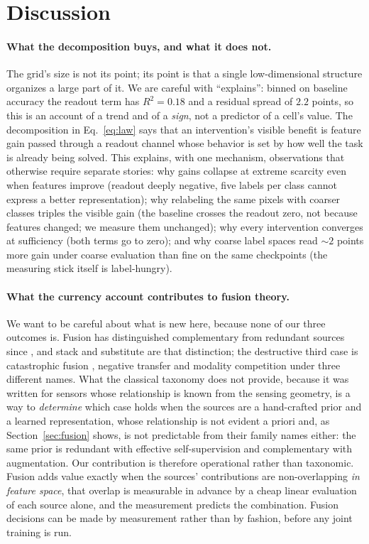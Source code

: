 \section{Discussion}\label{sec:discussion}

\paragraph{What the decomposition buys, and what it does not.}
The grid's size is not its point; its point is that a single
low-dimensional structure organizes a large part of it. We are careful
with ``explains'': binned on baseline accuracy the readout term has
$R^2 = 0.18$ and a residual spread of $2.2$ points, so this is an
account of a trend and of a \emph{sign}, not a predictor of a cell's
value. The decomposition in Eq.~\ref{eq:law} says that an
intervention's visible benefit is feature gain passed through a
readout channel whose behavior is set by how well the task is already
being solved. This explains, with one mechanism, observations that
otherwise require separate stories: why gains collapse at extreme
scarcity even when features improve (readout deeply negative, five
labels per class cannot express a better representation); why relabeling
the same pixels with coarser classes triples the visible gain (the
baseline crosses the readout zero, not because features changed; we
measure them unchanged); why every intervention converges at sufficiency
(both terms go to zero); and why coarse label spaces read ${\sim}2$ points more gain
under coarse evaluation than fine on the same checkpoints (the measuring
stick itself is label-hungry).

\paragraph{What the currency account contributes to fusion theory.}
We want to be careful about what is new here, because none of our three
outcomes is. Fusion has distinguished complementary from redundant sources
since \citet{durrantwhyte1988sensor}, and stack and substitute are that
distinction; the destructive third case is catastrophic fusion
\citep{movellan1997catastrophic}, negative transfer
\citep{wang2019negative} and modality competition
\citep{wang2020multimodal} under three different names. What the classical taxonomy does not provide, because it
was written for sensors whose relationship is known from the sensing
geometry, is a way to \emph{determine} which case holds when the sources
are a hand-crafted prior and a learned representation, whose relationship
is not evident a priori and, as Section~\ref{sec:fusion} shows, is not
predictable from their family names either: the same prior is redundant
with effective self-supervision and complementary with augmentation.
Our contribution is therefore operational rather than taxonomic. Fusion
adds value exactly when the sources' contributions are non-overlapping
\emph{in feature space}, that overlap is measurable in advance by a cheap
linear evaluation of each source alone, and the measurement predicts the
combination. Fusion decisions can be made by measurement rather than by
fashion, before any joint training is run.

